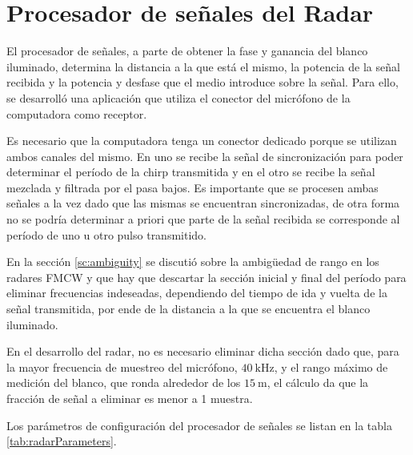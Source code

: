 \section{Procesador de señales del Radar} \label{sc:radarProcessor}

El procesador de señales, a parte de obtener la fase y ganancia del blanco iluminado, determina la distancia a la que está el mismo, la potencia de la señal recibida y la potencia y desfase que el medio introduce sobre la señal. Para ello, se desarrolló una aplicación que utiliza el conector del micrófono de la computadora como receptor.

Es necesario que la computadora tenga un conector dedicado porque se utilizan ambos canales del mismo. En uno se recibe la señal de sincronización para poder determinar el período de la chirp transmitida y en el otro se recibe la señal mezclada y filtrada por el pasa bajos. Es importante que se procesen ambas señales a la vez dado que las mismas se encuentran sincronizadas, de otra forma no se podría determinar a priori que parte de la señal recibida se corresponde al período de uno u otro pulso transmitido.

En la sección \ref{sc:ambiguity} se discutió sobre la ambigüedad de rango en los radares FMCW y que hay que descartar la sección inicial y final del período para eliminar frecuencias indeseadas, dependiendo del tiempo de ida y vuelta de la señal transmitida, por ende de la distancia a la que se encuentra el blanco iluminado. 

En el desarrollo del radar, no es necesario eliminar dicha sección dado que, para la mayor frecuencia de muestreo del micrófono, $\SI{40}{\kHz}$, y el rango máximo de medición del blanco, que ronda alrededor de los $\SI{15}{\m}$, el cálculo da que la fracción de señal a eliminar es menor a 1 muestra.

Los parámetros de configuración del procesador de señales se listan en la tabla \ref{tab:radarParameters}.

